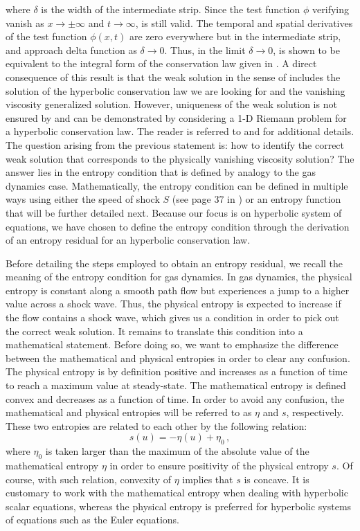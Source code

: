 where $\delta$ is the width of the intermediate strip. Since the test function $\phi$ verifying  vanish as $x \to \pm  \infty$ and $t \to \infty$,  is still valid. The temporal and spatial derivatives of the test function $\phi(x,t)$ are zero everywhere but in the intermediate strip, and approach delta function as $\delta \to 0$. Thus, in the limit $\delta \to 0$,  is shown to be equivalent to the integral form of the conservation law given in . A direct consequence of this result is that the weak solution in the sense of  includes the solution of the hyperbolic conservation law we are looking for and the vanishing viscosity generalized solution. However, uniqueness of the weak solution is not ensured by  and can be demonstrated by considering a 1-D Riemann problem for a hyperbolic conservation law. The reader is referred to \cite{Toro} and \cite{Leveque} for additional details. The question arising from the previous statement is: how to identify the correct weak solution that corresponds to the physically vanishing viscosity solution? The answer lies in the entropy condition that is defined by analogy to the gas dynamics case. Mathematically, the entropy condition can be defined in multiple ways using either the speed of shock $S$ (see page 37 in \cite{Leveque}) or an entropy function that will be further detailed next. Because our focus is on hyperbolic system of equations, we have chosen to define the entropy condition through the derivation of an entropy residual for an hyperbolic conservation law. 

Before detailing the steps employed to obtain an entropy residual, we recall the meaning of the entropy condition for gas dynamics. In gas dynamics, the physical entropy is constant along a smooth path flow but experiences a jump to a higher value across a shock wave. Thus, the physical entropy is expected to increase if the flow contains a shock wave, which gives us a condition in order to pick out the correct weak solution. It remains to translate this condition into a mathematical statement. Before doing so, we want to emphasize the difference between the mathematical and physical entropies in order to clear any confusion. The physical entropy is by definition positive and increases as a function of time to reach a maximum value at steady-state. The mathematical entropy is defined convex and decreases as a function of time. In order to avoid any confusion, the mathematical and physical entropies will be referred to as $\eta$ and $s$, respectively. These two entropies are related to each other by the following relation:
%
\begin{equation}
s(u) = -\eta (u) + \eta_0 \,,
\end{equation}
%  
where $\eta_0$ is taken larger than the maximum of the absolute value of the mathematical entropy $\eta$ in order to ensure positivity of the physical entropy $s$. Of course, with such relation, convexity of $\eta$ implies that $s$ is concave. It is customary to work with the mathematical entropy when dealing with hyperbolic scalar equations, whereas the physical entropy is preferred for hyperbolic systems of equations such as the Euler equations. 

